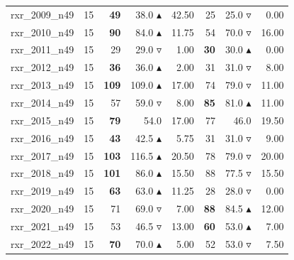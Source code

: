\begin{table}[]
{\begin{tabular}{ll@{\hspace{1.2cm}}rrr@{\hspace{1.2cm}}rrr}
rxr_2009_n49 & 15 & \textbf{49} & 38.0 $\blacktriangle$ & 42.50 & 25 & 25.0 $\triangledown$ & 0.00 \\
rxr_2010_n49 & 15 & \textbf{90} & 84.0 $\blacktriangle$ & 11.75 & 54 & 70.0 $\triangledown$ & 16.00 \\
rxr_2011_n49 & 15 & 29 & 29.0 $\triangledown$ & 1.00 & \textbf{30} & 30.0 $\blacktriangle$ & 0.00 \\
rxr_2012_n49 & 15 & \textbf{36} & 36.0 $\blacktriangle$ & 2.00 & 31 & 31.0 $\triangledown$ & 8.00 \\
rxr_2013_n49 & 15 & \textbf{109} & 109.0 $\blacktriangle$ & 17.00 & 74 & 79.0 $\triangledown$ & 11.00 \\
rxr_2014_n49 & 15 & 57 & 59.0 $\triangledown$ & 8.00 & \textbf{85} & 81.0 $\blacktriangle$ & 11.00 \\
rxr_2015_n49 & 15 & \textbf{79} & 54.0 \phantom{$\blacktriangle$} & 17.00 & 77 & 46.0 \phantom{$\blacktriangle$} & 19.50 \\
rxr_2016_n49 & 15 & \textbf{43} & 42.5 $\blacktriangle$ & 5.75 & 31 & 31.0 $\triangledown$ & 9.00 \\
rxr_2017_n49 & 15 & \textbf{103} & 116.5 $\blacktriangle$ & 20.50 & 78 & 79.0 $\triangledown$ & 20.00 \\
rxr_2018_n49 & 15 & \textbf{101} & 86.0 $\blacktriangle$ & 15.50 & 88 & 77.5 $\triangledown$ & 15.50 \\
rxr_2019_n49 & 15 & \textbf{63} & 63.0 $\blacktriangle$ & 11.25 & 28 & 28.0 $\triangledown$ & 0.00 \\
rxr_2020_n49 & 15 & 71 & 69.0 $\triangledown$ & 7.00 & \textbf{88} & 84.5 $\blacktriangle$ & 12.00 \\
rxr_2021_n49 & 15 & 53 & 46.5 $\triangledown$ & 13.00 & \textbf{60} & 53.0 $\blacktriangle$ & 7.00 \\
rxr_2022_n49 & 15 & \textbf{70} & 70.0 $\blacktriangle$ & 5.00 & 52 & 53.0 $\triangledown$ & 7.50 \\
\bottomrule
    \end{tabular}
    }
\end{table}
